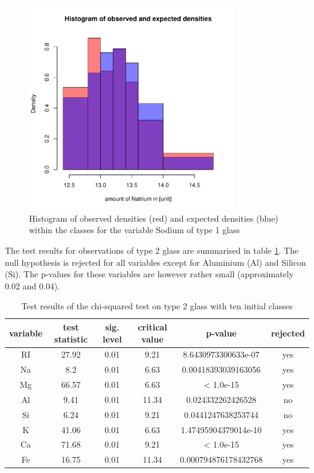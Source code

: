 \documentclass[a4paper, 12pt, titlepage, headsepline, listof = totoc, bibliography = totoc, numbers = noenddot]{scrartcl}
\begin{document}
\begin{figure}[h!]
\centering
\includegraphics[width=0.8\textwidth]{report-chisqType1Na}
\caption{Histogram of observed densities (red) and expected densities (blue) within the classes for the variable Sodium of type 1 glass}
\label{fig:chisqType1Na}
\end{figure}

The test results for observations of type 2 glass are summarised in table \ref{tab:chi-type2}. The null hypothesis is rejected for all variables except for Aluminium (Al) and Silicon (Si). The p-values for these variables are however rather small (approximately 0.02 and 0.04).

\begin{table}[h]
\centering
\begin{tabular}{|cccccc|} \hline variable & test statistic & sig. level & critical value & p-value & rejected\\ \hline RI & 27.92 & 0.01 & 9.21 & 8.6430973300633e-07 & yes\\ 
Na & 8.2 & 0.01 & 6.63 & 0.00418393039163056 & yes\\ 
Mg & 66.57 & 0.01 & 6.63 & < 1.0e-15 & yes\\ 
Al & 9.41 & 0.01 & 11.34 & 0.024332262426528 & no\\ 
Si & 6.24 & 0.01 & 9.21 & 0.0441247638253744 & no\\ 
K & 41.06 & 0.01 & 6.63 & 1.47495904379014e-10 & yes\\ 
Ca & 71.68 & 0.01 & 9.21 & < 1.0e-15 & yes\\ 
Fe & 16.75 & 0.01 & 11.34 & 0.000794876178432768 & yes\\ \hline \end{tabular}\caption{Test results of the chi-squared test on type 2 glass with ten initial classes}
\label{tab:chi-type2}
\end{table}
\end{document}
